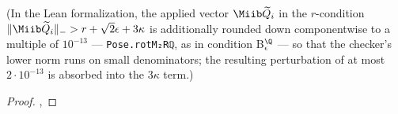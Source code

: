 \begin{theorem}
    (In the Lean formalization, the applied vector $\Miib \widetilde{Q}_i$ in the
    $r$-condition $\| \Miib \widetilde{Q}_i \|_{-} > r + \sqrt{2} \epsilon + 3\kappa$
    is additionally rounded down componentwise to a multiple of $10^{-13}$ ---
    \texttt{Pose.rotM₂Rℚ}, as in condition B$^{\Q}_\epsilon$ --- so that the
    checker's lower norm runs on small denominators; the resulting perturbation of
    at most $2 \cdot 10^{-13}$ is absorbed into the $3\kappa$ term.)
\end{theorem}

\begin{proof}
\leanok
{},
\end{proof}

